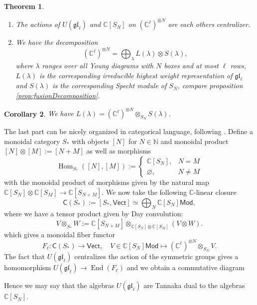 \documentclass[11pt]{report}
\newtheorem{theorem}{Theorem}[section]
\newtheorem{corollary}[theorem]{Corollary}
\theoremstyle{definition}
\theoremstyle{remark}
\theoremstyle{remark}
\newcommand{\Hom}{\operatorname{Hom}}
\newcommand{\End}{\operatorname{End}}
\newcommand{\N}{\mathbb{N}}
\newcommand{\C}{\mathbb{C}}
\begin{document}
\begin{theorem}
\begin{enumerate}[label=(\roman*)]
\item The actions of $U(\mathfrak{gl}_\ell)$ and $\C[S_N]$ on $(\C^\ell)^{\otimes N}$ are each others centralizer.
\item We have the decomposition
\begin{equation*}
(\C^\ell)^{\otimes N} = \bigoplus_{\lambda} L(\lambda) \otimes S(\lambda),
\end{equation*}
where $\lambda$ ranges over all Young diagrams with $N$ boxes and at most $\ell$ rows, $L(\lambda)$ is the corresponding irreducible highest weight representation of $\mathfrak{gl}_\ell$ and $S(\lambda)$ is the corresponding Specht module of $S_N$, compare proposition \ref{prop:fusionDecomposition}.
\end{enumerate}
\end{theorem}

\begin{corollary}
We have $L(\lambda) = (\C^\ell)^{\otimes N} \otimes_{S_N} S(\lambda)$.
\end{corollary}

The last part can be nicely organized in categorical language, following \cite{article:davydov:2010}. Define a monoidal category $S_*$ with objects $[N]$ for $N \in \N$ and monoidal product $[N] \otimes [M] := [N+M]$ as well as morphisms
\begin{equation*}
\Hom_{S_*}([N],[M]) :=
\begin{cases}
\C[S_N], & N = M \\
\varnothing, & N \neq M
\end{cases}
\end{equation*}
with the monoidal product of morphisms given by the natural map $\C[S_N] \otimes \C[S_M] \to \C[S_{N+M}]$. We now take the following $\C$-linear closure
\begin{equation*}
\mathsf{C}(S_*) := [S_*,\mathsf{Vect}] \simeq \bigoplus_N \C[S_N]\mathsf{Mod},
\end{equation*}
where we have a tensor product given by Day convolution:
\begin{equation*}
V \otimes_{S_*} W := \C[S_{N+M}] \otimes_{\C[S_N] \otimes \C[S_M]} (V \otimes W).
\end{equation*}
which gives a monoidal fiber functor
\begin{equation*}
F_\ell: \mathsf{C}(S_*) \to \mathsf{Vect}, \quad V \in \C[S_N]\mathsf{Mod} \mapsto (\C^\ell)^{\otimes N} \otimes_{S_N} V.
\end{equation*}
The fact that $U(\mathfrak{gl}_\ell)$ centralizes the action of the symmetric groups gives a homomorphism $U(\mathfrak{gl}_\ell) \to \End(F_\ell)$ and we obtain a commutative diagram
\begin{center}
\end{center}
Hence we may say that the algebras $U(\mathfrak{gl}_\ell)$ are Tannaka dual to the algebras $\C[S_N]$.
\end{document}
